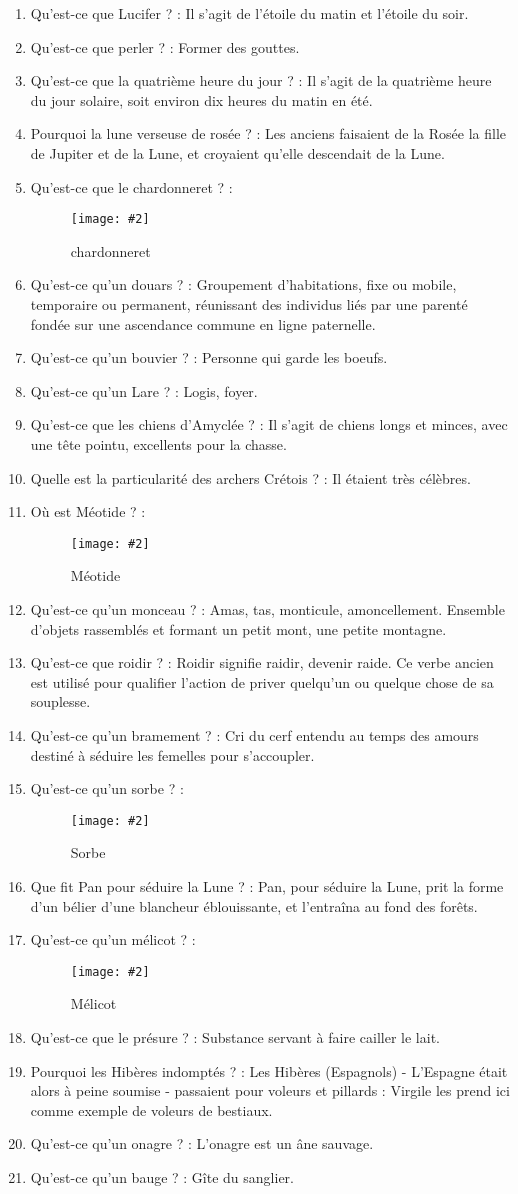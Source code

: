\documentclass[a4paper, 11pt, hidelinks]{article}
\newcommand{\img}[4]{\begin{figure}[!ht]
    \centering
    \texttt{[image: \#2]}
    \caption{#3}
    \label{#4}
    \end{figure} }
\begin{document}
\begin{enumerate}
      \item Qu'est-ce que Lucifer ? : Il s'agit de l'étoile du matin et l'étoile du soir.
      \item Qu'est-ce que perler ? : Former des gouttes.
      \item Qu'est-ce que la quatrième heure du jour ? : Il s'agit de la quatrième heure du jour solaire, soit environ dix heures du matin en été.
      \item Pourquoi la lune verseuse de rosée ? : Les anciens faisaient de la Rosée la fille de Jupiter et de la Lune, et croyaient qu'elle descendait de la Lune.
      \item Qu'est-ce que le chardonneret ? :
            \img{0.2}{chardonneret.jpg}{chardonneret}{126}
      \item Qu'est-ce qu'un douars ? : Groupement d'habitations, fixe ou mobile, temporaire ou permanent, réunissant des individus liés par une parenté fondée sur une ascendance commune en ligne paternelle.
      \item Qu'est-ce qu'un bouvier ? : Personne qui garde les boeufs.
      \item Qu'est-ce qu'un Lare ? : Logis, foyer.
      \item Qu'est-ce que les chiens d'Amyclée ? : Il s'agit de chiens longs et minces, avec une tête pointu, excellents pour la chasse.
      \item Quelle est la particularité des archers Crétois ? : Il étaient très célèbres.
      \item Où est Méotide ? :
            \img{0.3}{Méotide.png}{Méotide}{127}
            \newpage
      \item Qu'est-ce qu'un monceau ? : Amas, tas, monticule, amoncellement. Ensemble d'objets rassemblés et formant un petit mont, une petite montagne.
      \item Qu'est-ce que roidir ? : Roidir signifie raidir, devenir raide. Ce verbe ancien est utilisé pour qualifier l'action de priver quelqu'un ou quelque chose de sa souplesse.
      \item Qu'est-ce qu'un bramement ? : Cri du cerf entendu au temps des amours destiné à séduire les femelles pour s'accoupler.
      \item Qu'est-ce qu'un sorbe ? :
            \img{0.1}{Sorbe.jpg}{Sorbe}{128}
      \item Que fit Pan pour séduire la Lune ? : Pan, pour séduire la Lune, prit la forme d'un bélier d'une blancheur éblouissante, et l'entraîna au fond des forêts.
      \item Qu'est-ce qu'un mélicot ? :
            \img{1.5}{Mélicot.jpg}{Mélicot}{129}
      \item Qu'est-ce que le présure ? : Substance servant à faire cailler le lait.
      \item Pourquoi les Hibères indomptés ? : Les Hibères (Espagnols) - L'Espagne était alors à peine soumise - passaient pour voleurs et pillards : Virgile les prend ici comme exemple de voleurs de bestiaux.
      \item Qu'est-ce qu'un onagre ? : L'onagre est un âne sauvage.
      \item Qu'est-ce qu'un bauge ? : Gîte du sanglier.
\end{enumerate}
\end{document}
